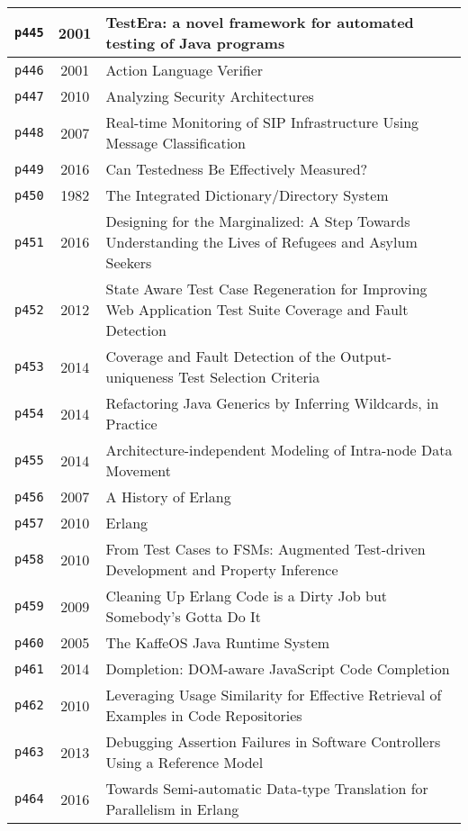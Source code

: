 \begin{longtable}{| c | c | p{16cm} |}
  \hline
  \texttt{p445} & 2001 & TestEra: a novel framework for automated testing of Java programs \\
  \hline
  \texttt{p446} & 2001 & Action Language Verifier \\
  \hline
  \texttt{p447} & 2010 & Analyzing Security Architectures \\
  \hline
  \texttt{p448} & 2007 & Real-time Monitoring of SIP Infrastructure Using Message Classification \\
  \hline
  \texttt{p449} & 2016 & Can Testedness Be Effectively Measured? \\
  \hline
  \texttt{p450} & 1982 & The Integrated Dictionary/Directory System \\
  \hline
  \texttt{p451} & 2016 & Designing for the Marginalized: A Step Towards Understanding the Lives of Refugees and Asylum Seekers \\
  \hline
  \texttt{p452} & 2012 & State Aware Test Case Regeneration for Improving Web Application Test Suite Coverage and Fault Detection \\
  \hline
  \texttt{p453} & 2014 & Coverage and Fault Detection of the Output-uniqueness Test Selection Criteria \\
  \hline
  \texttt{p454} & 2014 & Refactoring Java Generics by Inferring Wildcards, in Practice \\
  \hline
  \texttt{p455} & 2014 & Architecture-independent Modeling of Intra-node Data Movement \\
  \hline
  \texttt{p456} & 2007 & A History of Erlang \\
  \hline
  \texttt{p457} & 2010 & Erlang \\
  \hline
  \texttt{p458} & 2010 & From Test Cases to FSMs: Augmented Test-driven Development and Property Inference \\
  \hline
  \texttt{p459} & 2009 & Cleaning Up Erlang Code is a Dirty Job but Somebody's Gotta Do It \\
  \hline
  \texttt{p460} & 2005 & The KaffeOS Java Runtime System \\
  \hline
  \texttt{p461} & 2014 & Dompletion: DOM-aware JavaScript Code Completion \\
  \hline
  \texttt{p462} & 2010 & Leveraging Usage Similarity for Effective Retrieval of Examples in Code Repositories \\
  \hline
  \texttt{p463} & 2013 & Debugging Assertion Failures in Software Controllers Using a Reference Model \\
  \hline
  \texttt{p464} & 2016 & Towards Semi-automatic Data-type Translation for Parallelism in Erlang \\

\end{longtable}
